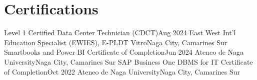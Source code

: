 \section{Certifications}

\resumeSubHeadingListStart
    \resumeSubheading
    {Level 1 Certified Data Center Technician (CDCT)}{Aug 2024}
    {East West Int'l Education Specialist (EWIES), E-PLDT Vitro}{Naga City, Camarines Sur}
    \resumeSubheading
    {Smartbooks and Power BI Certificate of Completion}{Jun 2024}
    {Ateneo de Naga University}{Naga City, Camarines Sur}
    \resumeSubheading
    {SAP Business One DBMS for IT Certificate of Completion}{Oct 2022}
    {Ateneo de Naga University}{Naga City, Camarines Sur}
\resumeSubHeadingListEnd